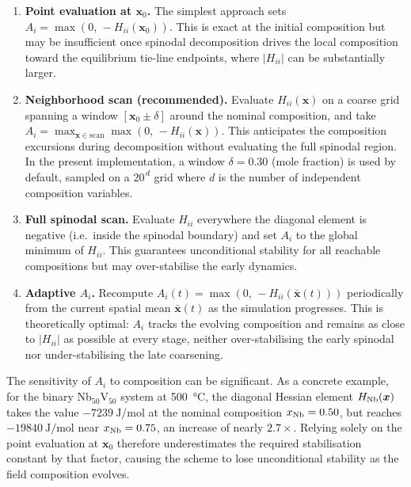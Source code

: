 {\begin{enumerate}
    \item \textbf{Point evaluation at $\boldsymbol{x}_0$.}
          The simplest approach sets
          $A_i = \max(0,\,-H_{ii}(\boldsymbol{x}_0))$.
          This is exact at the initial composition but may be
          insufficient once spinodal decomposition drives the local
          composition toward the equilibrium tie-line endpoints, where
          $|H_{ii}|$ can be substantially larger.

    \item \textbf{Neighborhood scan (recommended).}
          Evaluate $H_{ii}(\boldsymbol{x})$ on a coarse grid spanning
          a window $[\boldsymbol{x}_0 \pm \delta]$ around the nominal
          composition, and take
          $A_i = \max_{\boldsymbol{x}\in\text{scan}}\max(0,\,-H_{ii}(\boldsymbol{x}))$.
          This anticipates the composition excursions during
          decomposition without evaluating the full spinodal region.
          In the present implementation, a window $\delta = 0.30$
          (mole fraction) is used by default, sampled on a $20^{\,d}$
          grid where $d$ is the number of independent composition
          variables.

    \item \textbf{Full spinodal scan.}
          Evaluate $H_{ii}$ everywhere the diagonal element is
          negative (i.e.\ inside the spinodal boundary) and set $A_i$
          to the global minimum of $H_{ii}$.  This guarantees
          unconditional stability for all reachable compositions but
          may over-stabilise the early dynamics.

    \item \textbf{Adaptive $A_i$.}
          Recompute $A_i(t) = \max(0,\,-H_{ii}(\bar{\boldsymbol{x}}(t)))$
          periodically from the current spatial mean
          $\bar{\boldsymbol{x}}(t)$ as the simulation progresses.
          This is theoretically optimal: $A_i$ tracks the evolving
          composition and remains as close to $|H_{ii}|$ as possible
          at every stage, neither over-stabilising the early spinodal
          nor under-stabilising the late coarsening.
\end{enumerate}

The sensitivity of $A_i$ to composition can be significant.  As a
concrete example, for the binary Nb$_{50}$V$_{50}$ system at
\SI{500}{\celsius}, the diagonal Hessian element
$H_{\rm Nb}(\boldsymbol{x})$ takes the value
$\SI{-7239}{\joule\per\mol}$ at the nominal composition
$x_{\rm Nb} = 0.50$, but reaches $\SI{-19840}{\joule\per\mol}$ near
$x_{\rm Nb} = 0.75$, an increase of nearly $2.7\times$.  Relying
solely on the point evaluation at $\boldsymbol{x}_0$ therefore
underestimates the required stabilisation constant by that factor,
causing the scheme to lose unconditional stability as the field
composition evolves.

}
